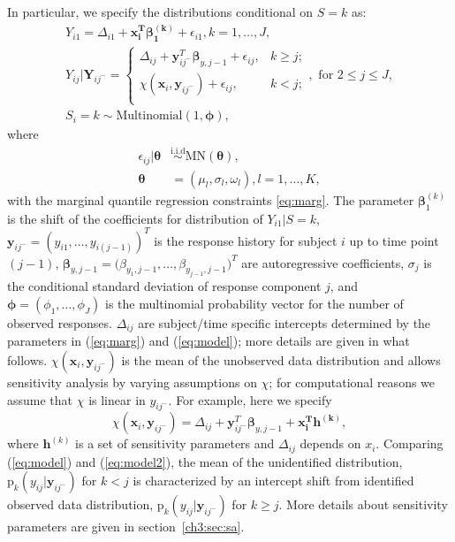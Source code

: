 \documentclass[12pt]{article}
\newcommand{\iid}{\stackrel{\mbox{i.i.d}}{\sim}}
\newcommand{\pr}{\mbox{p}}
\begin{document}
In particular, we specify the distributions conditional on $S=k$ as:
\begin{equation}
  \begin{array}{l}
      \displaystyle Y_{i1} = \Delta_{i1} +  \bm{x_{i}^T\beta_1^{(k)}} + \epsilon_{i1} , k = 1, \ldots, J,\\
       \displaystyle        Y_{ij}|\bm Y_{ij^{-}} =
      \begin{cases}
        \Delta_{ij} + \bm y_{ij^{-}}^T \bm \beta_{y,j-1} + \epsilon_{ij}, & k \geq j ;  \\
        \chi(\bm x_{i}, \bm y_{ij^{-}}) + \epsilon_{ij}, & k < j ;  \\
      \end{cases}, \mbox{ for } 2 \leq j \leq J,  \\
       S_{i} = k \sim \textrm{Multinomial}(1, \bm \phi),
    \end{array}
  \label{eq:model}
\end{equation}
where
\begin{equation}
\begin{aligned}
\epsilon_{ij} |\bm \theta & \iid \mbox{MN}(\bm \theta),  \\
\bm \theta & = (\mu_l, \sigma_l, \omega_l), l = 1, \ldots, K,
\end{aligned}\label{eq:mixprob}
\end{equation}
with the marginal quantile regression constraints \eqref{eq:marg}.
The parameter $\bm \beta_1^{(k)}$ is the shift of the coefficients for distribution of $Y_{i1} | S = k$,
$\bm y_{ij^{-}} = (y_{i1}, \ldots, y_{i(j-1)})^T$ is the response history for subject $i$ up to time point  $(j-1)$,
$\bm \beta_{y, j-1} = \big(\beta_{y_1, j-1}, \ldots, \beta_{y_{j-1}, j-1} \big)^T$ are autoregressive coefficients,
$\sigma_j$ is the conditional standard deviation of response component $j$, and
$\bm \phi = (\phi_1, \ldots, \phi_J)$ is the multinomial probability vector for the number of observed responses.
$\Delta_{ij}$ are subject/time specific intercepts determined by the parameters in (\ref{eq:marg}) and (\ref{eq:model}); more details are given in what follows.
$\chi(\bm x_{i}, \bm y_{ij^{-}})$ is the mean of the unobserved data distribution and allows sensitivity analysis by varying assumptions on $\chi$; for computational reasons we assume that $\chi$ is linear in $y_{ij^{-}}$.
For example, here we specify
\begin{equation}
\label{eq:model2}
\chi(\bm x_{i}, \bm y_{ij^{-}}) = \Delta_{ij}  + \bm y_{ij^{-}}^T \bm \beta_{y,j-1} + \bm{x_{i}^{T} h^{(k)}} ,
\end{equation}
where $\bm h^{(k)}$ is a set of sensitivity parameters and $\Delta_{ij}$ depends on $x_i$.
Comparing (\ref{eq:model}) and (\ref{eq:model2}), the mean of the unidentified distribution,
$\pr_k(y_{ij}|\bm y_{ij^{-}})$ for $k < j$ is characterized by an intercept shift from identified observed data distribution, $\pr_k(y_{ij}|\bm y_{ij^{-}})$ for $k \geq j$.
More details about sensitivity parameters are given in section~\ref{ch3:sec:sa}.
\end{document}
